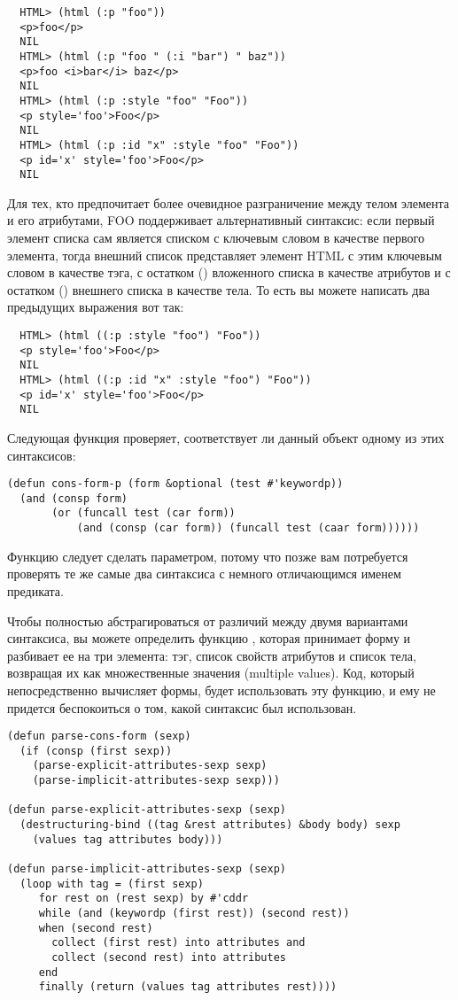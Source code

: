 \begin{verbatim}
  HTML> (html (:p "foo"))
  <p>foo</p>
  NIL
  HTML> (html (:p "foo " (:i "bar") " baz"))
  <p>foo <i>bar</i> baz</p>
  NIL
  HTML> (html (:p :style "foo" "Foo"))
  <p style='foo'>Foo</p>
  NIL
  HTML> (html (:p :id "x" :style "foo" "Foo"))
  <p id='x' style='foo'>Foo</p>
  NIL
\end{verbatim}

Для тех, кто предпочитает более очевидное разграничение между телом элемента и его
атрибутами, FOO поддерживает альтернативный синтаксис: если первый элемент списка сам
является списком с ключевым словом в качестве первого элемента, тогда внешний список
представляет элемент HTML с этим ключевым словом в качестве тэга, с остатком ()
вложенного списка в качестве атрибутов и с остатком () внешнего списка в
качестве тела. То есть вы можете написать два предыдущих выражения вот так:

\begin{verbatim}
  HTML> (html ((:p :style "foo") "Foo"))
  <p style='foo'>Foo</p>
  NIL
  HTML> (html ((:p :id "x" :style "foo") "Foo"))
  <p id='x' style='foo'>Foo</p>
  NIL
\end{verbatim}

Следующая функция проверяет, соответствует ли данный объект одному из этих синтаксисов:

\begin{lstlisting}
(defun cons-form-p (form &optional (test #'keywordp))
  (and (consp form)
       (or (funcall test (car form))
           (and (consp (car form)) (funcall test (caar form))))))
\end{lstlisting}

Функцию  следует сделать параметром, потому что позже вам потребуется проверять
те же самые два синтаксиса с немного отличающимся именем предиката.

Чтобы полностью абстрагироваться от различий между двумя вариантами синтаксиса, вы можете
определить функцию , которая принимает форму и разбивает ее на три
элемента: тэг, список свойств атрибутов и список тела, возвращая их как множественные
значения (multiple values). Код, который непосредственно вычисляет формы, будет
использовать эту функцию, и ему не придется беспокоиться о том, какой синтаксис был
использован.

\begin{lstlisting}
(defun parse-cons-form (sexp)
  (if (consp (first sexp))
    (parse-explicit-attributes-sexp sexp)
    (parse-implicit-attributes-sexp sexp)))

(defun parse-explicit-attributes-sexp (sexp)
  (destructuring-bind ((tag &rest attributes) &body body) sexp
    (values tag attributes body)))

(defun parse-implicit-attributes-sexp (sexp)
  (loop with tag = (first sexp)
     for rest on (rest sexp) by #'cddr
     while (and (keywordp (first rest)) (second rest))
     when (second rest)
       collect (first rest) into attributes and
       collect (second rest) into attributes
     end
     finally (return (values tag attributes rest))))
\end{lstlisting}


